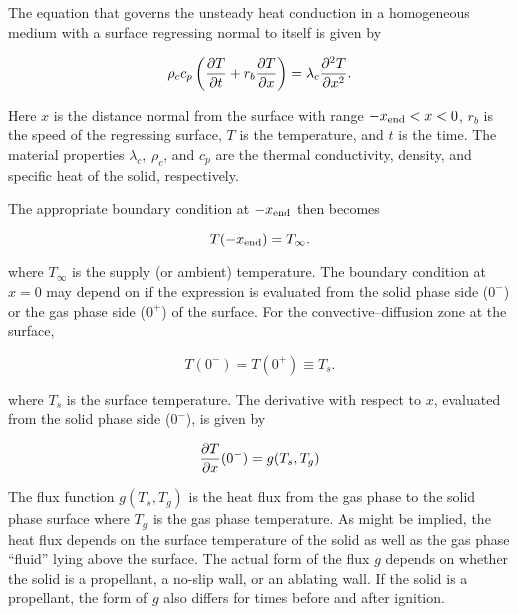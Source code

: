 \setcounter{figure}{0}
\setcounter{table}{0}
\setcounter{equation}{0}


The equation that governs the unsteady heat conduction in a homogeneous medium with a surface regressing normal to itself is given by

\begin{equation}
\rho_c c_p \left( {\partial T \over \partial t} + r_b {\partial T \over \partial x} \right)
 = \lambda_c {\partial^2 T \over \partial x^2}.
\label{eq:sld}
\end{equation}

Here $x$ is the distance normal from the surface with range $-x_{\rm end} < x < 0$, $r_b$ is the speed of the regressing surface, $T$ is the temperature, and $t$ is the time. The material properties $\lambda_c$, $\rho_c$, and $c_p$ are the thermal conductivity, density, and specific heat of the solid, respectively.

The appropriate boundary condition at $-x_{\rm end}$ then becomes

\begin{equation}
T(-x_{\rm end}) = T_\infty.
\label{eq:bc1}
\end{equation}

where $T_\infty$ is the supply (or ambient) temperature. The boundary condition at $x = 0$ may depend on if the expression is evaluated from the solid phase side ($0^-$) or the gas phase side ($0^+$) of the surface. For the convective--diffusion zone at the surface,

\begin{equation}
T(0^-)=T(0^+)\equiv T_s.
\label{eq:bc2}
\end{equation}

where $T_s$ is the surface temperature. The derivative with respect to $x$, evaluated from the solid phase side ($0^-$), is given by

\begin{equation}
{\partial T \over \partial x}(0^-) = g(T_s,T_g)
\label{eq:bc3}
\end{equation}

The flux function $g(T_s,T_g)$ is the heat flux from the gas phase to the solid phase surface where $T_g$ is the gas phase temperature. As might be implied, the heat flux depends on the surface temperature of the solid as well as the gas phase ``fluid'' lying above the surface. The actual form of the flux $g$ depends on whether the solid is a propellant, a no-slip wall, or an ablating wall. If the solid is a propellant, the form of $g$ also differs for times before and after ignition.